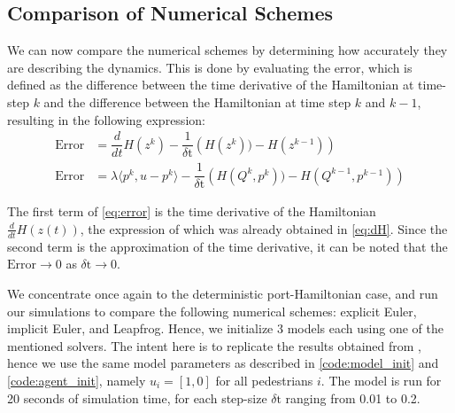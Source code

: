 \subsection{Comparison of Numerical Schemes}
\label{section:compare_num_solvers}
We can now compare the numerical schemes by determining how accurately they are describing the dynamics. This is done by evaluating the error, which is defined as the difference between the time derivative of the Hamiltonian at time-step $k$ and the difference between the Hamiltonian at time step $k$ and $k-1$, resulting in the following expression:
\begin{align}
    \text{Error} &= \dfrac{d}{dt}H(z^k) - \dfrac{1}{\delta \text{t}}\left(H(z^k)) - H(z^{k-1})\right) \nonumber \\ 
    \text{Error} &= \lambda\langle p^k,u-p^k\rangle - \dfrac{1}{\delta \text{t}}\left(H(Q^k, p^k)) - H(Q^{k-1}, p^{k-1})\right)
    \label{eq:error}
\end{align}

The first term of \autoref{eq:error} is the time derivative of the Hamiltonian $\frac{d}{dt}H(z(t))$, the expression of which was already obtained in \autoref{eq:dH}. Since the second term is the approximation of the time derivative, it can be noted that the $\text{Error} \rightarrow 0$ as $\delta \text{t} \rightarrow 0$. 

We concentrate once again to the deterministic port-Hamiltonian case, and run our simulations to compare the following numerical schemes: explicit Euler, implicit Euler, and Leapfrog. Hence, we initialize 3 models each using one of the mentioned solvers. The intent here is to replicate the results obtained from \cite{tordeux2022multi}, hence we use the same model parameters as described in \autoref{code:model_init} and \autoref{code:agent_init}, namely $u_i = [1,0]$ for all pedestrians $i$. The model is run for 20 seconds of simulation time, for each step-size $\delta \text{t}$ ranging from 0.01 to 0.2.


